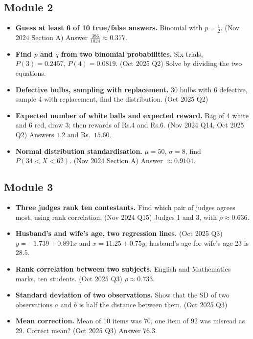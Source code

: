 \documentclass[11pt,a4paper]{article}
\begin{document}
\subsection{Module 2}
\begin{itemize}
\item \textbf{Guess at least 6 of 10 true/false answers.} Binomial with $p=\tfrac12$. (Nov 2024 Section A) Answer $\tfrac{386}{1024}\approx 0.377$.
\item \textbf{Find $p$ and $q$ from two binomial probabilities.} Six trials, $P(3)=0.2457$, $P(4)=0.0819$. (Oct 2025 Q2) Solve by dividing the two equations.
\item \textbf{Defective bulbs, sampling with replacement.} 30 bulbs with 6 defective, sample 4 with replacement, find the distribution. (Oct 2025 Q2)
\item \textbf{Expected number of white balls and expected reward.} Bag of 4 white and 6 red, draw 3; then rewards of Rs.4 and Rs.6. (Nov 2024 Q14, Oct 2025 Q2) Answers $1.2$ and Rs.\ $15.60$.
\item \textbf{Normal distribution standardisation.} $\mu=50$, $\sigma=8$, find $P(34<X<62)$. (Nov 2024 Section A) Answer $\approx 0.9104$.
\end{itemize}

\subsection{Module 3}
\begin{itemize}
\item \textbf{Three judges rank ten contestants.} Find which pair of judges agrees most, using rank correlation. (Nov 2024 Q15) Judges 1 and 3, with $\rho\approx 0.636$.
\item \textbf{Husband's and wife's age, two regression lines.} (Oct 2025 Q3) $y=-1.739+0.891x$ and $x=11.25+0.75y$; husband's age for wife's age 23 is $28.5$.
\item \textbf{Rank correlation between two subjects.} English and Mathematics marks, ten students. (Oct 2025 Q3) $\rho\approx 0.733$.
\item \textbf{Standard deviation of two observations.} Show that the SD of two observations $a$ and $b$ is half the distance between them. (Oct 2025 Q3)
\item \textbf{Mean correction.} Mean of 10 items was 70, one item of 92 was misread as 29. Correct mean? (Oct 2025 Q3) Answer $76.3$.
\end{itemize}
\end{document}
